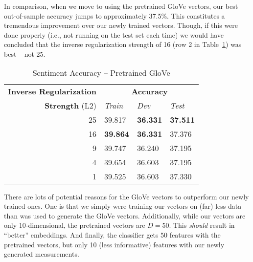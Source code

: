 \documentclass[fleqn]{MJD}
\newcommand{\0}{\emptyset}
\begin{document}
\noindent In comparison, when we move to using the pretrained GloVe vectors, our best out-of-sample accuracy jumps to approximately 37.5\%. This constitutes a tremendous improvement over our newly trained vectors. Though, if this were done properly (i.e., not running on the test set each time) we would have concluded that the inverse regularization strength of 16 (row 2 in Table~\ref{tab:glove_sentiment}) was best -- not 25.


\begin{table}[!htbp]
\centering
\caption{Sentiment Accuracy -- Pretrained GloVe}
\label{tab:glove_sentiment}
\begin{tabular}{@{}r|lll@{}}
\toprule
\textbf{Inverse Regularization} & \multicolumn{3}{c}{\textbf{Accuracy}}   		   \\ 
\textbf{Strength} (L2)  		& \textit{Train} & \textit{Dev}   & \textit{Test}  \\ \midrule
25                              & 39.817         & \textbf{36.331}& \textbf{37.511}\\
16                              & \textbf{39.864}& \textbf{36.331}& 37.376         \\
9                               & 39.747         & 36.240         & 37.195         \\
4                               & 39.654         & 36.603         & 37.195         \\
1                               & 39.525         & 36.603         & 37.330         \\ \bottomrule
\end{tabular}
\end{table}


\noindent There are lots of potential reasons for the GloVe vectors to outperform our newly trained ones. One is that we simply were training our vectors on (far) less data than was used to generate the GloVe vectors. Additionally, while our vectors are only 10-dimensional, the pretrained vectors are $D = 50$. This \textit{should} result in ``better'' embeddings. And finally, the classifier gets 50 features with the pretrained vectors, but only 10 (less informative) features with our newly generated measurements. 
\end{document}
